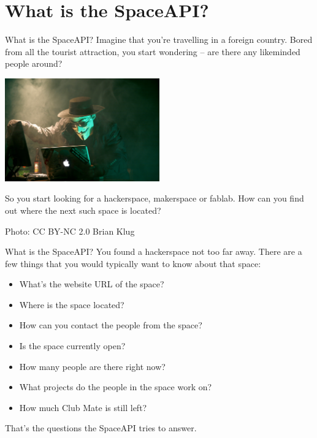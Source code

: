 \section{What is the SpaceAPI?}

\begin{frame}{What is the SpaceAPI?}
	Imagine that you're travelling in a foreign country. Bored from all the
	tourist attraction, you start wondering -- are there any likeminded people
	around?

	\vspace{1em}

	\centerline{
		\includegraphics[width=0.5\textwidth]{what_is_the_spaceapi/hacker.jpg}
	}

	So you start looking for a hackerspace, makerspace or fablab. How can you find
	out where the next such space is located?

	\vspace{1em}

	\tiny{Photo: CC BY-NC 2.0 Brian Klug}
\end{frame}

\begin{frame}{What is the SpaceAPI?}
	You found a hackerspace not too far away. There are a few things that you
	would typically want to know about that space:

	\begin{itemize}
		\item	What's the website URL of the space?
		\pause
		\item Where is the space located?
		\pause
		\item How can you contact the people from the space?
		\pause
		\item Is the space currently open?
		\pause
		\item How many people are there right now?
		\pause
		\item What projects do the people in the space work on?
		\pause
		\item How much Club Mate is still left?
	\end{itemize}

	\pause

	That's the questions the SpaceAPI tries to answer.
\end{frame}

